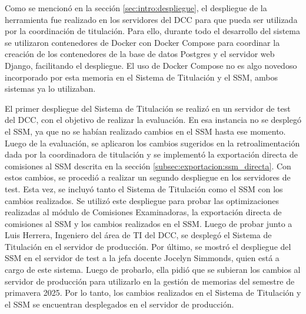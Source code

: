 Como se mencionó en la sección \ref{sec:intro:despliegue}, el despliegue de la herramienta
fue realizado en los servidores del DCC para que pueda ser utilizada por la coordinación
de titulación. Para ello, durante todo el desarrollo del sistema se utilizaron contenedores
de Docker con Docker Compose para coordinar la creación de los contenedores de la base de datos
Postgres y el servidor web Django, facilitando el despliegue. El uso de Docker Compose
no es algo novedoso incorporado por esta memoria en el Sistema de Titulación y el SSM, ambos sistemas
ya lo utilizaban.

El primer despliegue del Sistema de Titulación se realizó en un servidor de test del DCC,
con el objetivo de realizar la evaluación. En esa instancia no se desplegó el SSM, ya que
no se habían realizado cambios en el SSM hasta ese momento. Luego de la evaluación, se
aplicaron los cambios sugeridos en la retroalimentación dada por la coordinadora de titulación
y se implementó la exportación directa de comisiones al SSM descrita en la sección
\ref{subsec:exportacion:ssm_directa}. Con estos cambios, se procedió a realizar un segundo
despliegue en los servidores de test. Esta vez, se incluyó tanto el Sistema de Titulación
como el SSM con los cambios realizados. Se utilizó este despliegue para probar las optimizaciones
realizadas al módulo de Comisiones Examinadoras, la exportación directa de comisiones al
SSM y los cambios realizados en el SSM. Luego de probar junto a Luis Herrera, Ingeniero
del área de TI del DCC, se desplegó el Sistema de Titulación en el servidor de producción.
Por último, se mostró el despliegue del SSM en el servidor de test a la jefa docente
Jocelyn Simmonds, quien está a cargo de este sistema. Luego de probarlo, ella pidió que
se subieran los cambios al servidor de producción para utilizarlo en la gestión de
memorias del semestre de primavera 2025. Por lo tanto, los cambios realizados en el
Sistema de Titulación y el SSM se encuentran desplegados en el servidor de producción.